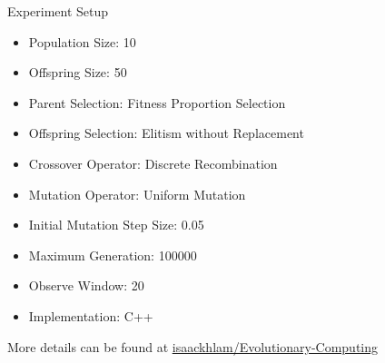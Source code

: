     \begin{frame}{Experiment Setup}
        \begin{itemize}
            \item Population Size: 10
            \item Offspring Size: 50
            \item Parent Selection: Fitness Proportion Selection
            \item Offspring Selection: Elitism without Replacement
            \item Crossover Operator: Discrete Recombination
            \item Mutation Operator: Uniform Mutation
            \item Initial Mutation Step Size: 0.05
            \item Maximum Generation: 100000
            \item Observe Window: 20
            \item Implementation: C++
        \end{itemize}
        More details can be found at \href{https://github.com/isaackhlam/Evolutionary-Computing}{isaackhlam/Evolutionary-Computing}
    \end{frame}
    
